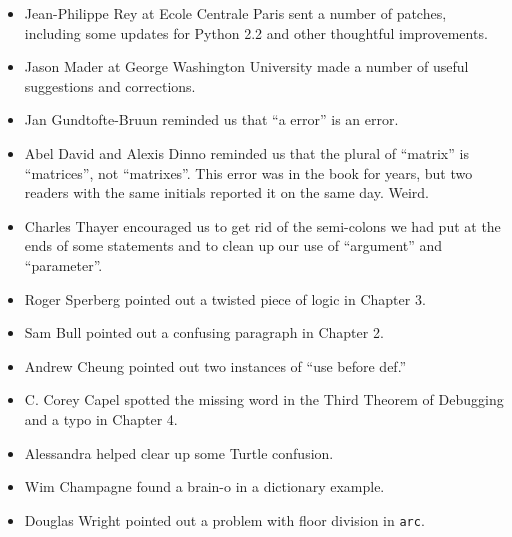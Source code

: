 \documentclass[10pt]{book}
\begin{document}
\begin{itemize}
\item Jean-Philippe Rey at Ecole Centrale
Paris sent a number of patches, including some updates for Python 2.2
and other thoughtful improvements.

\item Jason Mader at George Washington University made a number
of useful suggestions and corrections.

\item Jan Gundtofte-Bruun reminded us that ``a error'' is an error.

\item Abel David and Alexis Dinno reminded us that the plural of
``matrix'' is ``matrices'', not ``matrixes''.  This error was in the
book for years, but two readers with the same initials reported it on
the same day.  Weird.

\item Charles Thayer encouraged us to get rid of the semi-colons
we had put at the ends of some statements and to clean up our
use of ``argument'' and ``parameter''.

\item Roger Sperberg pointed out a twisted piece of logic in Chapter 3.

\item Sam Bull pointed out a confusing paragraph in Chapter 2.

\item Andrew Cheung pointed out two instances of ``use before def.''


\item C. Corey Capel spotted the missing word in the Third Theorem
of Debugging and a typo in Chapter 4.

\item Alessandra helped clear up some Turtle confusion.


\item Wim Champagne found a brain-o in a dictionary example.


\item Douglas Wright pointed out a problem with floor division in
{\tt arc}.


\end{itemize}
\end{document}
